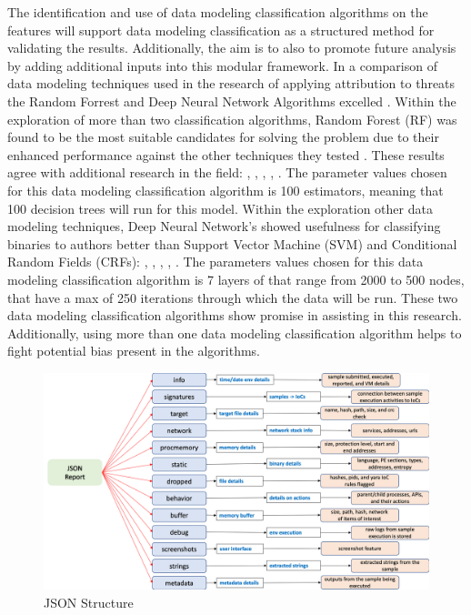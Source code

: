 \documentclass[12pt]{report}
\begin{document}
The identification and use of data modeling classification algorithms on the features will support data modeling classification as a structured method for validating the results.  Additionally, the aim is to also to promote future analysis by adding additional inputs into this modular framework.  In a comparison of data modeling techniques used in the research of applying attribution to threats the Random Forrest and Deep Neural Network Algorithms excelled \cite{gray2021identifying}.  Within the exploration of more than two classification algorithms, Random Forest (RF) was found to be the most suitable candidates for solving the problem due to their enhanced performance against the other techniques they tested  \cite{hong2018classifying}.  These results agree with additional research in the field: \cite{hendrikse2017effect}, \cite{caliskan2015coding}, \cite{kalgutkar2018android}, \cite{meng2016fine}, \cite{gonzalez2018authorship}.  The parameter values chosen for this data modeling classification algorithm is 100 estimators, meaning that 100 decision trees will run for this model.  Within the exploration other data modeling techniques, Deep Neural Network's showed usefulness for classifying binaries to authors better than Support Vector Machine (SVM) and Conditional Random Fields (CRFs): \cite{meng2018binary}, \cite{rosenberg2017deepapt}, \cite{rosenberg2018end}, \cite{alrabaee2019feasibility}, \cite{alrabaee2019bineye}.  The parameters values chosen for this data modeling classification algorithm is 7 layers of that range from 2000 to 500 nodes, that have a max of 250 iterations through which the data will be run.  These two data modeling classification algorithms show promise in assisting in this research.  Additionally, using more than one data modeling classification algorithm helps to fight potential bias present in the algorithms.

\begin{figure}
	\centering
	\includegraphics[width=1\textwidth]{images/JSON_Structure2.png}
	\caption{JSON Structure}
	\label{fig:JSON_Structure}
\end{figure}
\end{document}
